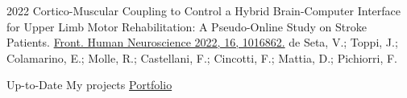 \documentclass[9pt]{developercv} %
\begin{document}
\vspace{-15 pt}
\begin{entrylist}
    \entry
		{2022}
		{Cortico-Muscular Coupling to Control a Hybrid Brain-Computer Interface for Upper Limb Motor Rehabilitation: A Pseudo-Online Study on Stroke Patients.}
		{\textcolor{blue}{\href{https://doi.org/10.3389/fnhum.2022.1016862}
{Front. Human Neuroscience 2022, 16, 1016862.}}}
		{de Seta, V.; Toppi, J.; Colamarino, E.; Molle, R.; Castellani, F.; Cincotti, F.; Mattia, D.; Pichiorri, F.}
    
\end{entrylist}


\vspace{-15 pt}
\begin{entrylist}
    \entry
		{Up-to-Date}
		{My projects}
		{\textcolor{blue}{\href{https://filippocastellani.github.io/Portfolio/}{Portfolio}}}
		{  }
\end{entrylist}
\end{document}
